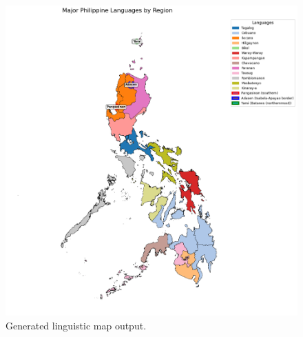 \begin{figure}[h]
    \centering
    \includegraphics[width=\columnwidth]{lingmap/artifacts/lingmap_out.png}
    \caption{Generated linguistic map output.}\label{fig:lingmap_out}
\end{figure}

